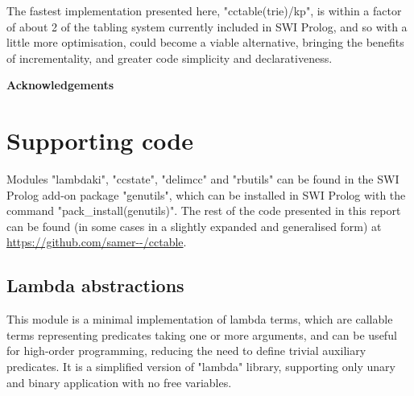 
The fastest implementation presented here, "cctable(trie)/kp", is within a factor of about 
2 of the tabling system currently included in SWI Prolog, and so with a little more 
optimisation, could become a viable alternative, bringing the benefits of incrementality,
and greater code simplicity and declarativeness.

\bigskip
\noindent
\textbf{Acknowledgements}\\[0.5em]
\TheAcknowledgments

\appendix
\section{Supporting code}

Modules "lambdaki", "ccstate", "delimcc" and "rbutils" can be found in the SWI Prolog
add-on package "genutils", which can be installed in SWI Prolog with the command
"pack_install(genutils)". The rest of the code presented in this report can be
found (in some cases in a slightly expanded and generalised form) 
at \url{https://github.com/samer--/cctable}.

\subsection{Lambda abstractions}
\label{sec:lambdaki}

This module is a minimal implementation of lambda terms, which are callable terms representing
predicates taking one or more arguments, and can be useful for high-order programming,
reducing the need to define trivial auxiliary predicates. It is a simplified version of 
 "lambda" library,
supporting only unary and binary application with no free variables.


